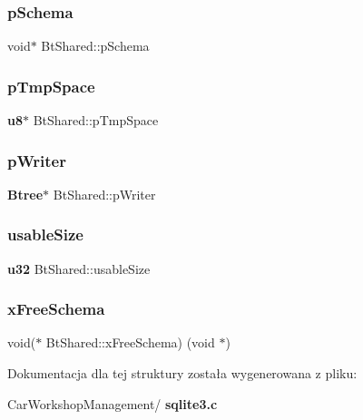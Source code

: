 \subsubsection{pSchema}
{\footnotesize\ttfamily void$\ast$ Bt\+Shared\+::p\+Schema}

\mbox{\label{struct_bt_shared_a89102c20327da8a304f7e95af557bdf4}} 
\subsubsection{pTmpSpace}
{\footnotesize\ttfamily \textbf{ u8}$\ast$ Bt\+Shared\+::p\+Tmp\+Space}

\mbox{\label{struct_bt_shared_ad8b2679e54027d58a3be3afcca4df1d6}} 
\subsubsection{pWriter}
{\footnotesize\ttfamily \textbf{ Btree}$\ast$ Bt\+Shared\+::p\+Writer}

\mbox{\label{struct_bt_shared_a3209efe543084a7e60f22913a794f5cb}} 
\subsubsection{usableSize}
{\footnotesize\ttfamily \textbf{ u32} Bt\+Shared\+::usable\+Size}

\mbox{\label{struct_bt_shared_af8f5f15b6ff3f66a8abb34ddc14d4d7a}} 
\subsubsection{xFreeSchema}
{\footnotesize\ttfamily void($\ast$ Bt\+Shared\+::x\+Free\+Schema) (void $\ast$)}



Dokumentacja dla tej struktury została wygenerowana z pliku\+:\begin{DoxyCompactItemize}
\item 
Car\+Workshop\+Management/\textbf{ sqlite3.\+c}\end{DoxyCompactItemize}

